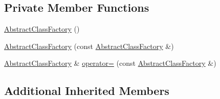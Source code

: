 \subsection*{Private Member Functions}
\begin{DoxyCompactItemize}
\item 
\hyperlink{classapollo_1_1cyber_1_1class__loader_1_1utility_1_1AbstractClassFactory_a85e48f47ba55628db5366e5d0ffa93d6}{Abstract\-Class\-Factory} ()
\item 
\hyperlink{classapollo_1_1cyber_1_1class__loader_1_1utility_1_1AbstractClassFactory_a78e77a1598aca2b898d1a6323bb785af}{Abstract\-Class\-Factory} (const \hyperlink{classapollo_1_1cyber_1_1class__loader_1_1utility_1_1AbstractClassFactory}{Abstract\-Class\-Factory} \&)
\item 
\hyperlink{classapollo_1_1cyber_1_1class__loader_1_1utility_1_1AbstractClassFactory}{Abstract\-Class\-Factory} \& \hyperlink{classapollo_1_1cyber_1_1class__loader_1_1utility_1_1AbstractClassFactory_a2e3f984f03050a8ddc9fb47664a6d109}{operator=} (const \hyperlink{classapollo_1_1cyber_1_1class__loader_1_1utility_1_1AbstractClassFactory}{Abstract\-Class\-Factory} \&)
\end{DoxyCompactItemize}
\subsection*{Additional Inherited Members}


